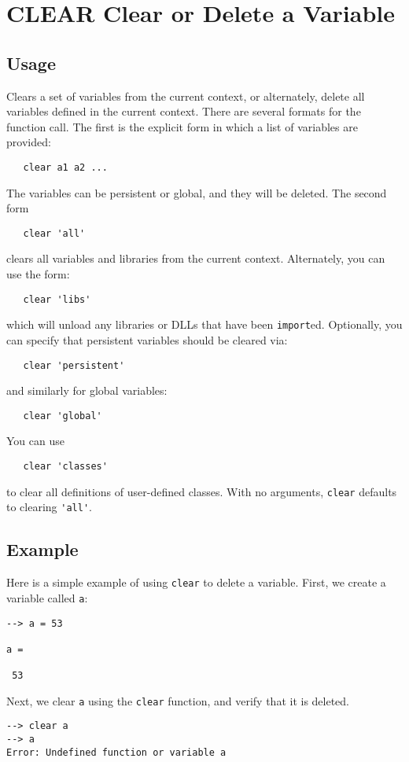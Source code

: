 \section{CLEAR Clear or Delete a Variable}

\subsection{Usage}

Clears a set of variables from the current context, or alternately, 
delete all variables defined in the current context.  There are
several formats for the function call.  The first is the explicit form
in which a list of variables are provided:
\begin{verbatim}
   clear a1 a2 ...
\end{verbatim}
The variables can be persistent or global, and they will be deleted.
The second form
\begin{verbatim}
   clear 'all'
\end{verbatim}
clears all variables and libraries from the current context.  Alternately, you can
use the form:
\begin{verbatim}
   clear 'libs'
\end{verbatim}
which will unload any libraries or DLLs that have been \verb|import|ed. 
Optionally, you can specify that persistent variables should be cleared via:
\begin{verbatim}
   clear 'persistent'
\end{verbatim}
and similarly for global variables:
\begin{verbatim}
   clear 'global'
\end{verbatim}
You can use
\begin{verbatim}
   clear 'classes'
\end{verbatim}
to clear all definitions of user-defined classes.
With no arguments, \verb|clear| defaults to clearing \verb|'all'|.
\subsection{Example}

Here is a simple example of using \verb|clear| to delete a variable.  First, we create a variable called \verb|a|:
\begin{verbatim}
--> a = 53

a = 

 53 
\end{verbatim}
Next, we clear \verb|a| using the \verb|clear| function, and verify that it is deleted.
\begin{verbatim}
--> clear a
--> a
Error: Undefined function or variable a
\end{verbatim}
